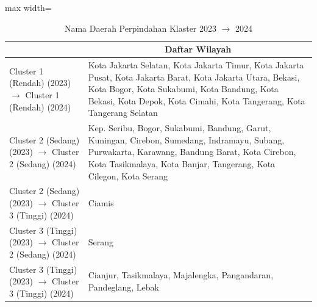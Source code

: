 \begin{table}[H]
\centering
\caption{Nama Daerah Perpindahan Klaster 2023 \(\rightarrow\) 2024} \label{tab:app2transname2023x2024}
\begin{adjustbox}{max width=\textwidth}
\begin{tabular}{|>{\centering\arraybackslash}p{4cm}|p{10cm}|}
\hline
\multicolumn{1}{|c|}{\textbf{Kategori}} & \multicolumn{1}{c|}{\textbf{Daftar Wilayah}} \\
\hline
Cluster 1 (Rendah) (2023) \(\rightarrow\) Cluster 1 (Rendah) (2024) & Kota Jakarta Selatan, Kota Jakarta Timur, Kota Jakarta Pusat, Kota Jakarta Barat, Kota Jakarta Utara, Bekasi, Kota Bogor, Kota Sukabumi, Kota Bandung, Kota Bekasi, Kota Depok, Kota Cimahi, Kota Tangerang, Kota Tangerang Selatan \\
\hline
Cluster 2 (Sedang) (2023) \(\rightarrow\) Cluster 2 (Sedang) (2024) & Kep. Seribu, Bogor, Sukabumi, Bandung, Garut, Kuningan, Cirebon, Sumedang, Indramayu, Subang, Purwakarta, Karawang, Bandung Barat, Kota Cirebon, Kota Tasikmalaya, Kota Banjar, Tangerang, Kota Cilegon, Kota Serang \\
\hline
Cluster 2 (Sedang) (2023) \(\rightarrow\) Cluster 3 (Tinggi) (2024) & Ciamis \\
\hline
Cluster 3 (Tinggi) (2023) \(\rightarrow\) Cluster 2 (Sedang) (2024) & Serang \\
\hline
Cluster 3 (Tinggi) (2023) \(\rightarrow\) Cluster 3 (Tinggi) (2024) & Cianjur, Tasikmalaya, Majalengka, Pangandaran, Pandeglang, Lebak \\
\hline
\end{tabular}
\end{adjustbox}
\end{table}
